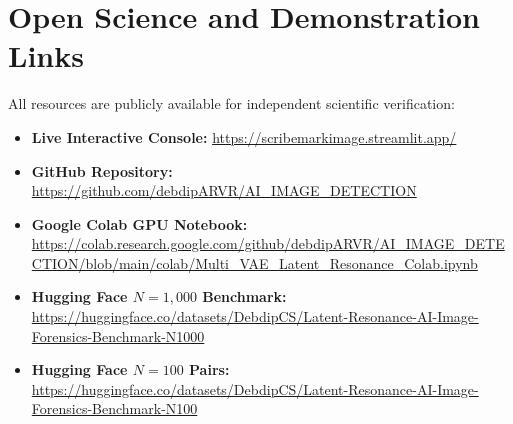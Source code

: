 \documentclass[letterpaper]{article}
\begin{document}
\section{Open Science and Demonstration Links}
\label{sec:links}

All resources are publicly available for independent scientific verification:
\begin{itemize}
    \item \textbf{Live Interactive Console:} \url{https://scribemarkimage.streamlit.app/}
    \item \textbf{GitHub Repository:} \url{https://github.com/debdipARVR/AI_IMAGE_DETECTION}
    \item \textbf{Google Colab GPU Notebook:} \url{https://colab.research.google.com/github/debdipARVR/AI_IMAGE_DETECTION/blob/main/colab/Multi_VAE_Latent_Resonance_Colab.ipynb}
    \item \textbf{Hugging Face $N=1,000$ Benchmark:} \url{https://huggingface.co/datasets/DebdipCS/Latent-Resonance-AI-Image-Forensics-Benchmark-N1000}
    \item \textbf{Hugging Face $N=100$ Pairs:} \url{https://huggingface.co/datasets/DebdipCS/Latent-Resonance-AI-Image-Forensics-Benchmark-N100}
\end{itemize}



\end{document}
